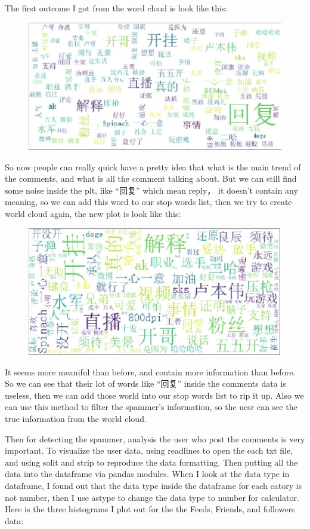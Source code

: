 \documentclass[sigconf]{acmart}
\begin{document}
The first outcome I got from the word cloud is look like this:
\begin{figure}[h]
\includegraphics[width=\columnwidth]{2.jpg}
\end{figure}
So now people can really quick have a pretty idea that what is the main trend of the comments, and what is all the comment talking about. But we can still find some noise inside the plt, like ``回复'' which mean reply， it doesn't contain any meaning, so we can add this word to our stop words list, then we try to create world cloud again, the new plot is look like this:
\begin{figure}[h]
\includegraphics[width=\columnwidth]{3.jpg}
\end{figure}
It seems more meaniful than before, and contain more information than before. So we can see that their lot of words like ``回复'' inside the comments data is useless, then we can add those world into our stop words list to rip it up. Also we can use this method to filter the spammer's information, so the uesr can see the true information from the world cloud.

Then for detecting the spammer, analysis the user who post the comments is very important. To visualize the user data, using readlines to open the each txt file, and using solit and strip to reproduce the data formatting. Then putting all the data into the dataframe via pandas modules. When I look at the data type in dataframe, I found out that the data type inside the dataframe for each catory is not number, then I use astype to change the data type to number for calculator. Here is the three histograms I plot out for the the Feeds, Friends, and followers data: 
\end{document}
